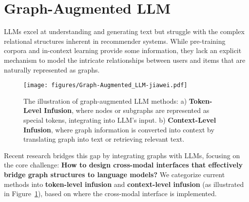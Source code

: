 


\section{Graph-Augmented LLM}
\label{sec:graph-llm}

LLMs excel at understanding and generating text but struggle with the complex relational structures inherent in recommender systems. While pre-training corpora and in-context learning provide some information, they lack an explicit mechanism to model the intricate relationships between users and items that are naturally represented as graphs.
\begin{figure}[t]
    \centering
    \texttt{[image: figures/Graph-Augmented\_LLM-jiawei.pdf]}
    \caption{The illustration of graph-augmented LLM methods: 
    a) \textbf{Token-Level Infusion}, where nodes or subgraphs are represented as special tokens, integrating into LLM's input.
    b) \textbf{Context-Level Infusion}, where graph information is converted into context by translating graph into text or retrieving relevant text.}
    \label{fig:graph-augmented LLM}
\end{figure}
Recent research bridges this gap by integrating graphs with LLMs, focusing on the core challenge: \textbf{How to design cross-modal interfaces that effectively bridge graph structures to language models?} We categorize current methods into \textbf{token-level infusion} and \textbf{context-level infusion} (as illustrated in Figure~\ref{fig:graph-augmented LLM}), based on where the cross-modal interface is implemented.

